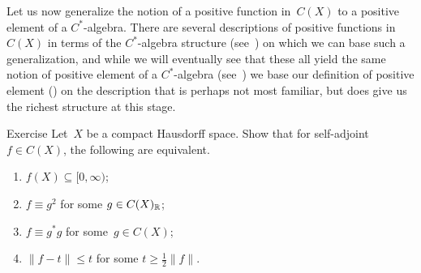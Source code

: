 \documentclass[a]{subfiles}
\begin{document}
\begin{parsec}%
\begin{point}%
Let us now generalize the notion of a positive function
in~$C(X)$
to a positive element of a $C^*$-algebra.
There are several descriptions of
positive functions in~$C(X)$ in terms of the $C^*$-algebra structure
(see~) on which we can base such a  generalization,
and while we will eventually see that these all yield the same notion
of positive element of a $C^*$-algebra (see~)
we base our definition of positive element ()
on the description that is perhaps
not most familiar,
but does give us the richest structure at this stage.
\end{point}
\begin{point}[cx-positive]{Exercise}%
Let~$X$ be a compact Hausdorff space.
Show that for self-adjoint $f\in C(X)$, the following are equivalent.
\begin{enumerate}
\item \label{cx-positive-1}
$f(X)\subseteq [0,\infty)$;
\item
$f\equiv g^2$ for some $g\in C(X)_{\mathbb{R}}$;
\item
$f\equiv g^* g$ for some~$g\in C(X)$;
\item
$\|f-t\|\leq t$ for some $t\geq \frac{1}{2}\|f\|$.


\end{enumerate}
\end{point}
\end{parsec}
\end{document}
